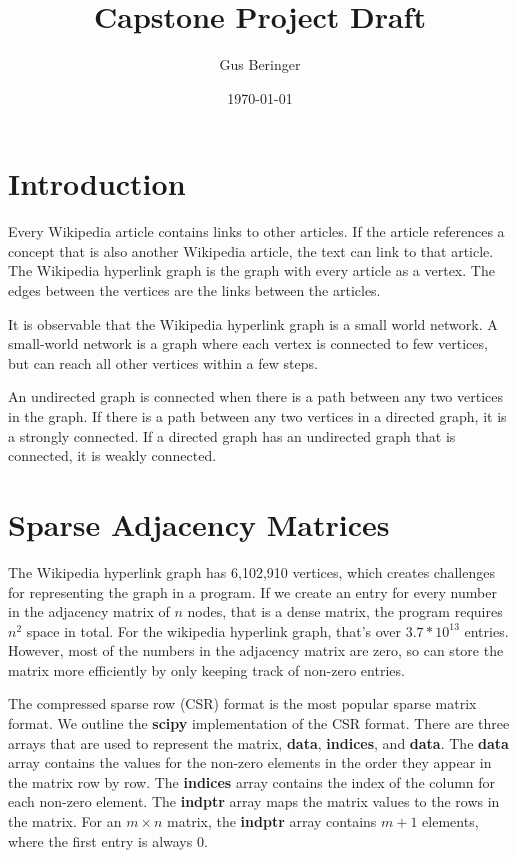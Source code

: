 \documentclass{article}
\author{Gus Beringer}
\title{Capstone Project Draft}
\date{\today}
\begin{document}
\maketitle
\tableofcontents

\section{Introduction}

Every Wikipedia article contains links to other articles. If the article references a concept that is also another Wikipedia article, the text can link to that article.
The Wikipedia hyperlink graph is the graph with every article as a vertex. The edges between the vertices are the links between the articles.

It is observable that the Wikipedia hyperlink graph is a small world network.
A small-world network is a graph where each vertex is connected to few vertices, but can reach all other vertices within a few steps.

An undirected graph is connected when there is a path between any two vertices in the graph.
If there is a path between any two vertices in a directed graph, it is a strongly connected.
If a directed graph has an undirected graph that is connected, it is weakly connected.



\section{Sparse Adjacency Matrices}

The Wikipedia hyperlink graph has 6,102,910 vertices, which creates challenges for representing the graph in a program.
If we create an entry for every number in the adjacency matrix of $n$ nodes, that is a dense matrix, the program requires $n^2$ space in total.  
For the wikipedia hyperlink graph, that's over $3.7 * 10^{13}$ entries.
However, most of the numbers in the adjacency matrix are zero, so can store the matrix more efficiently by only keeping track of non-zero entries.

The compressed sparse row (CSR) format is the most popular sparse matrix format.
We outline the \textbf{scipy} implementation of the CSR format.
There are three arrays that are used to represent the matrix, \textbf{data}, \textbf{indices}, and \textbf{data}.
\autocite{scipy_doc}
The \textbf{data} array contains the values for the non-zero elements in the order they appear in the matrix row by row.
The \textbf{indices} array contains the index of the column for each non-zero element.
The \textbf{indptr} array maps the matrix values to the rows in the matrix.
For an $m\times n$ matrix, the \textbf{indptr} array contains $m+1$ elements, where the first entry is always 0.
\end{document}
